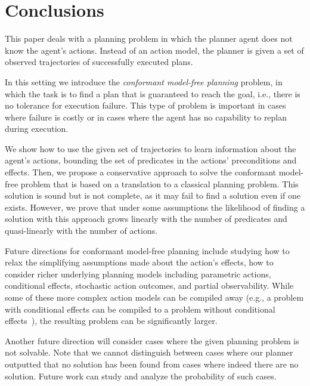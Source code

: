 \documentclass{article}
\begin{document}
	
	
	\section{Conclusions}
	This paper deals with a planning problem in which the planner agent does not know the agent's actions. Instead of an action model, the planner is given a set of observed trajectories of successfully executed plans. 
	
	
	In this setting we introduce the {\em conformant model-free planning} problem, in which the task is to find a plan that is guaranteed to reach the goal, i.e., there is no tolerance for execution failure. This type of problem is important in cases where failure is costly or in cases where the agent has no capability to replan during execution. 
	
	
	We show how to use the given set of trajectories to learn
	information about the agent's actions, bounding the set of predicates in the actions'  preconditions and effects. Then, we propose a conservative approach to solve the conformant model-free problem that is based on a translation to a classical planning problem. This solution is sound but is not complete, as it may fail to find a solution even if one exists. However, we prove that under some assumptions the likelihood of finding a solution with this approach grows linearly with the number of predicates and quasi-linearly with the number of actions. 
	
	
	Future directions for conformant model-free planning include studying how to relax the simplifying assumptions made about the action's effects, how to consider richer underlying planning models including parametric actions, conditional effects, stochastic action outcomes, and partial observability. While some of these more complex action models can be compiled away (e.g., a problem with conditional effects can be compiled to a problem without conditional effects~\cite{nebel2000compilability}), the resulting problem can be significantly larger.   
	
	
	Another future direction will consider cases where the given planning problem is not solvable.
	Note that we cannot distinguish between cases where our planner outputted that no solution has been found from cases where indeed there are no solution. Future work can study and analyze the probability of such cases.
	
	
	
	
\end{document}
